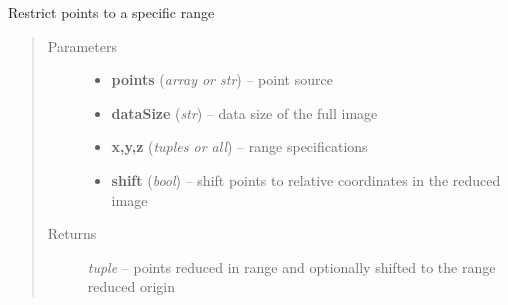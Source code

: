 \documentclass[letterpaper,10pt,english]{sphinxmanual}
\begin{document}
\begin{fulllineitems}
\label{api/ClearMap.IO:ClearMap.IO.IO.pointsToRange}
Restrict points to a specific range
\begin{quote}\begin{description}
\item[{Parameters}] \leavevmode\begin{itemize}
\item {} 
\textbf{points} (\emph{array or str}) --
point source

\item {} 
\textbf{dataSize} (\emph{str}) --
data size of the full image

\item {} 
\textbf{x,y,z} (\emph{tuples or all}) --
range specifications

\item {} 
\textbf{shift} (\emph{bool}) --
shift points to relative coordinates in the reduced image

\end{itemize}

\item[{Returns}] \leavevmode
\emph{tuple} --
points reduced in range and optionally shifted to the range reduced origin

\end{description}\end{quote}

\end{fulllineitems}

\end{document}
